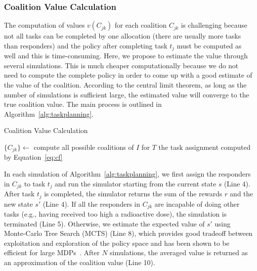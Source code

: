 \subsubsection{Coalition Value Calculation}
The computation of values  $v(C_{jk})$ for each coalition $C_{jk}$
is challenging because not all tasks can be completed by one
allocation (there are usually more tasks than responders) and the
policy after completing task $t_j$ must be computed as well and
this is time-consuming. Here, we propose to estimate the value
through several simulations. This is much cheaper computationally
because we do not need to compute the complete policy in order to
come up with a good estimate of the value of the coalition.
According to the central limit theorem, as long as the number of
simulations is sufficient large, the estimated value will converge
to the true coalition value. The main process is outlined in
Algorithm~\ref{alg:taskplanning}.
\begin{algorithm}[htbp]\small
  \caption{Coalition Value Calculation}
  \label{alg:taskplanning}
  \Indm
  \Indp\BlankLine
  $\{ C_{jk} \} \gets$ compute all possible coalitions of $I$ for
  $T$ \;
  \Return the task assignment computed by Equation~\ref{eq:cf}
\end{algorithm}

In each simulation of Algorithm~\ref{alg:taskplanning}, we first
assign the responders in $C_{jk}$ to task $t_j$ and run the
simulator starting from the current state $s$ (Line 4). After task
$t_j$ is completed, the simulator returns the sum of the rewards
$r$ and the new state $s'$ (Line 4). If all the responders in
$C_{jk}$ are incapable of doing other tasks (e.g., having received
too high a radioactive dose), the simulation is terminated (Line
5). Otherwise, we estimate the expected value of $s'$ using
Monte-Carlo Tree Search (MCTS) (Line 8), which provides good
tradeoff between exploitation and exploration of the policy space
and has been shown to be efficient for large MDPs~\cite{?}. After
$N$ simulations, the averaged value is returned as an approximation
of the coalition value (Line 10).

